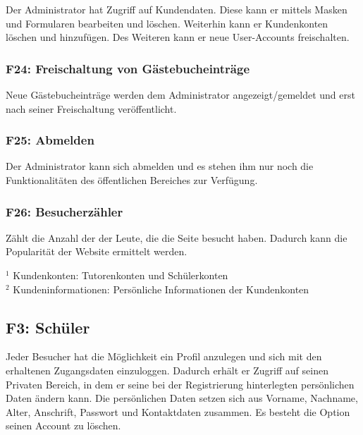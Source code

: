 \documentclass[10pt,a4paper]{scrartcl}
\begin{document}
Der Administrator hat Zugriff auf Kundendaten. Diese kann er mittels Masken und Formularen bearbeiten und löschen. Weiterhin kann er Kundenkonten löschen und hinzufügen. Des Weiteren kann er neue User-Accounts freischalten.

%

\subsubsection*{F24: Freischaltung von Gästebucheinträge}

Neue Gästebucheinträge werden dem Administrator angezeigt/gemeldet und erst nach seiner Freischaltung veröffentlicht.

\subsubsection*{F25: Abmelden}

Der Administrator kann sich abmelden und es stehen ihm nur noch die Funktionalitäten des öffentlichen Bereiches zur Verfügung.

\subsubsection*{F26: Besucherzähler}

Zählt die Anzahl der der Leute, die die Seite besucht haben. Dadurch kann die Popularität der Website ermittelt werden.
\bigskip

$^1$ Kundenkonten: Tutorenkonten und Schülerkonten\\
$^2$ Kundeninformationen: Persönliche Informationen der Kundenkonten




\subsection{F3: Schüler}
Jeder Besucher hat die Möglichkeit ein Profil anzulegen und sich mit den erhaltenen Zugangsdaten einzuloggen.
Dadurch erhält er Zugriff auf seinen Privaten Bereich, in dem er seine bei der Registrierung hinterlegten persönlichen Daten ändern kann.
Die persönlichen Daten setzen sich aus Vorname, Nachname, Alter, Anschrift, Passwort und Kontaktdaten zusammen.
Es besteht die Option seinen Account zu löschen.
\end{document}

